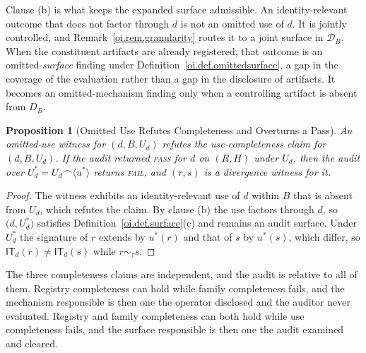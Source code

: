 \documentclass[11pt]{article}
\theoremstyle{plain}
\newtheorem{proposition}[theorem]{Proposition}
\theoremstyle{definition}
\theoremstyle{remark}
\newcommand{\IT}{\ensuremath{\mathsf{IT}}}
\newcommand{\PASS}{\textnormal{\textsc{pass}}}
\newcommand{\FAIL}{\textnormal{\textsc{fail}}}
\begin{document}
Clause (b) is what keeps the expanded surface admissible.
An identity-relevant outcome that does not factor through \(d\)
is not an omitted use of \(d\).
It is jointly controlled,
and Remark~\ref{oi.rem.granularity} routes it
to a joint surface in \(\mathcal{D}_B\).
When the constituent artifacts are already registered,
that outcome is an omitted-\emph{surface} finding
under Definition~\ref{oi.def.omittedsurface},
a gap in the coverage of the evaluation
rather than a gap in the disclosure of artifacts.
It becomes an omitted-mechanism finding
only when a controlling artifact is absent from \(D_B\).

\begin{proposition}[Omitted Use Refutes Completeness and Overturns a Pass]
  \label{oi.prop.refutes-use}
  An omitted-use witness for \((d,B,U_d)\)
  refutes the use-completeness claim for \((d,B,U_d)\).
  If the audit returned \PASS{} for \(d\) on \((R,H)\) under \(U_d\),
  then the audit over
  \(U_d^{\ast}=U_d\frown\langle u^{\ast}\rangle\)
  returns \FAIL{},
  and \((r,s)\) is a divergence witness for it.
\end{proposition}

\begin{proof}
  The witness exhibits an identity-relevant use of \(d\) within \(B\)
  that is absent from \(U_d\),
  which refutes the claim.
  By clause (b) the use factors through \(d\),
  so \(\bigl(d,U_d^{\ast}\bigr)\) satisfies
  Definition~\ref{oi.def.surface}(c)
  and remains an audit surface.
  Under \(U_d^{\ast}\) the signature of \(r\) extends by \(u^{\ast}(r)\)
  and that of \(s\) by \(u^{\ast}(s)\),
  which differ,
  so \(\IT_d(r)\neq\IT_d(s)\) while \(r\sim_{\tau}s\).
\end{proof}

The three completeness claims are independent, and the audit is relative to all of them.
Registry completeness can hold while family completeness fails,
and the mechanism responsible is then one the operator disclosed
and the auditor never evaluated.
Registry and family completeness can both hold while use completeness fails,
and the surface responsible is then one the audit examined and cleared.
\end{document}
